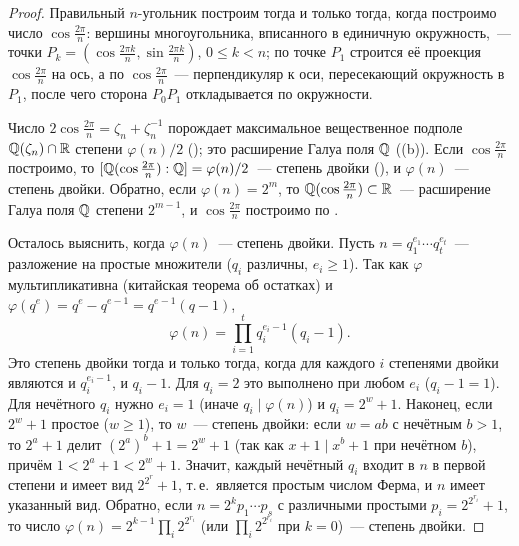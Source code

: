 \begin{proof}
Правильный $n$-угольник построим тогда и только тогда, когда построимо число $\cos\frac{2\pi}n$: вершины многоугольника,
вписанного в единичную окружность,~--- точки $P_k=(\cos\frac{2\pi k}n,\sin\frac{2\pi k}n)$, $0\le k<n$; по точке $P_1$
строится её проекция $\cos\frac{2\pi}n$ на ось, а по $\cos\frac{2\pi}n$~--- перпендикуляр к оси, пересекающий окружность в
$P_1$, после чего сторона $P_0P_1$ откладывается по окружности.

Число $2\cos\frac{2\pi}n=\zeta_n+\zeta_n^{-1}$ порождает максимальное вещественное подполе $\mathbb Q(\zeta_n)\cap\mathbb R$ степени
$\varphi(n)/2$ (); это расширение Галуа поля $\mathbb Q$ ((b)). Если $\cos\frac{2\pi}n$ построимо, то
$[\mathbb Q(\cos\frac{2\pi}n):\mathbb Q]=\varphi(n)/2$~--- степень двойки (), и $\varphi(n)$~--- степень двойки. Обратно, если
$\varphi(n)=2^m$, то $\mathbb Q(\cos\frac{2\pi}n)\subset\mathbb R$~--- расширение Галуа поля $\mathbb Q$ степени $2^{m-1}$, и $\cos\frac{2\pi}n$
построимо по .

Осталось выяснить, когда $\varphi(n)$~--- степень двойки. Пусть $n=q_1^{e_1}\cdots q_t^{e_t}$~--- разложение на простые
множители ($q_i$ различны, $e_i\ge1$). Так как $\varphi$ мультипликативна (китайская теорема об остатках) и
$\varphi(q^e)=q^e-q^{e-1}=q^{e-1}(q-1)$,
\[
\varphi(n)=\prod_{i=1}^tq_i^{e_i-1}(q_i-1).
\]
Это степень двойки тогда и только тогда, когда для каждого $i$ степенями двойки являются и $q_i^{e_i-1}$, и $q_i-1$. Для
$q_i=2$ это выполнено при любом $e_i$ ($q_i-1=1$). Для нечётного $q_i$ нужно $e_i=1$ (иначе $q_i\mid\varphi(n)$) и
$q_i=2^w+1$. Наконец, если $2^w+1$ простое ($w\ge1$), то $w$~--- степень двойки: если $w=ab$ с нечётным $b>1$, то
$2^a+1$ делит $(2^a)^b+1=2^w+1$ (так как $x+1\mid x^b+1$ при нечётном $b$), причём $1<2^a+1<2^w+1$. Значит, каждый
нечётный $q_i$ входит в $n$ в первой степени и имеет вид $2^{2^r}+1$, т.\,е.\ является простым числом Ферма, и $n$ имеет
указанный вид. Обратно, если $n=2^kp_1\cdots p_s$ с различными простыми $p_i=2^{2^{r_i}}+1$, то число
$\varphi(n)=2^{k-1}\prod_i2^{2^{r_i}}$ (или $\prod_i2^{2^{r_i}}$ при $k=0$)~--- степень двойки.
\end{proof}

